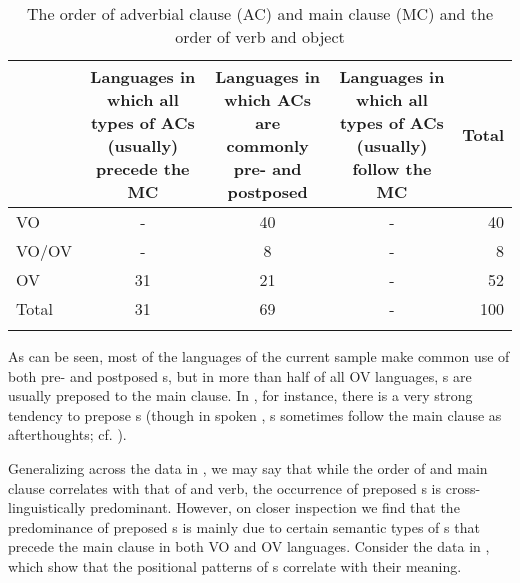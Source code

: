 \documentclass[output=paper]{langsci/langscibook}
\begin{document}
\begin{table}
\small
\begin{tabularx}{\textwidth}{lSSSr}
\lsptoprule
&   Languages in which all types of ACs (usually) precede the MC &   Languages in which ACs are commonly pre- and postposed &   Languages in which all types of ACs (usually) follow the MC &   Total\\
\midrule 
VO & - & 40 & - & 40\\
VO/OV & - & 8 & - & 8\\
OV & 31 & 21 & - & 52\\
\midrule
Total & 31 & 69 & - & 100\\
\lspbottomrule
\end{tabularx}

\caption{The order of adverbial clause (AC) and main clause (MC) and the order of verb and object}
\label{tab:diessel:1}
\end{table}

As can be seen, most of the languages of the current sample make common use of both pre- and postposed s, but in more than half of all OV languages, s are usually preposed to the main clause. In , for instance, there is a very strong tendency to prepose s (though in spoken , s sometimes follow the main clause as afterthoughts; cf. \citealt{FordMori1994}).

Generalizing across the data in , we may say that while the order of  and main clause correlates with that of  and verb, the occurrence of preposed s is cross-linguistically predominant. However, on closer inspection we find that the predominance of preposed s is mainly due to certain semantic types of s that precede the main clause in both VO and OV languages. Consider the data in , which show that the positional patterns of s correlate with their meaning.  
\end{document}
